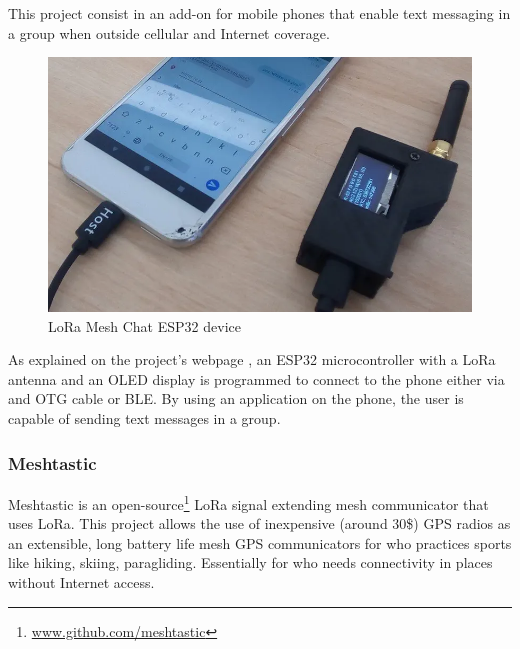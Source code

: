 				This project consist in an add-on for mobile phones that enable text messaging in a group when outside cellular and Internet coverage.	
			
				\noindent
				\begin{minipage}{0.6\textwidth}%
					\begin{figure}[H]
						\centering
						\includegraphics[width=.9\textwidth]{resources/img/chap4/lora-mesh-chat-5267d9}
						\caption{LoRa Mesh Chat ESP32 device}
						\label{img:lora_mesh_chat}
					\end{figure}
				\end{minipage}%
				\hfill%
				\begin{minipage}{0.4\textwidth}\raggedright
					As explained on the project's webpage \footnotemark, an ESP32 microcontroller with a LoRa antenna and an OLED display is programmed to connect to the phone either via and OTG cable or BLE.
					By using an application on the phone, the user is capable of sending text messages in a group.
				\end{minipage}			
				
				\subsubsection{Meshtastic}\label{subsubsec:meshtastic}
	
					Meshtastic is an open-source\footnote{ \url{www.github.com/meshtastic}} LoRa signal extending mesh communicator that uses LoRa.
					This project allows the use of inexpensive (around $30$\$) GPS radios as an extensible, long battery life mesh GPS communicators for who practices sports like hiking, skiing, paragliding.
					Essentially for who needs connectivity in places without Internet access.
					
